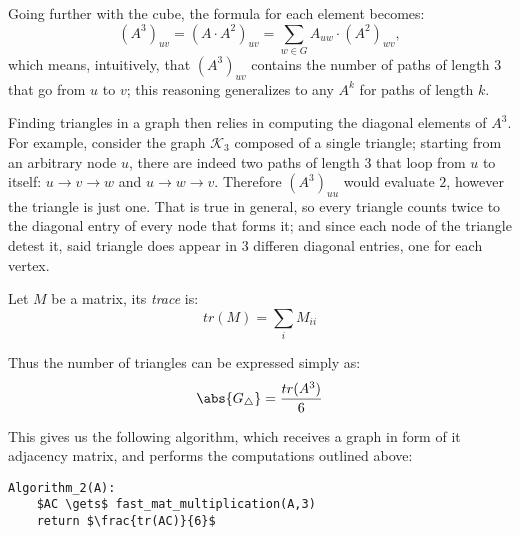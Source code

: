 Going further with the cube, the formula for each element becomes:
\[
    (A^3)_{uv} = \left( A \cdot A^2 \right)_{uv} = \sum_{w \in G} A_{uw} \cdot (A^2)_{wv},
\]
which means, intuitively, that $(A^3)_{uv}$ contains the number of paths of length $3$ that go from $u$ to $v$; this reasoning generalizes to any $A^k$ for paths of length $k$.

Finding triangles in a graph then relies in computing the diagonal elements of $A^3$. For example, consider the graph $\mathcal{K}_3$ composed of a single triangle; starting from an arbitrary node $u$, there are indeed two paths of length $3$ that loop from $u$ to itself: $u \to v \to w$ and $u \to w \to v$. Therefore $(A^3)_{uu}$ would evaluate $2$, however the triangle is just one. That is true in general, so every triangle counts twice to the diagonal entry of every node that forms it; and since each node of the triangle detest it, said triangle does appear in $3$ differen diagonal entries, one for each vertex.

\begin{definition}
    Let $M$ be a matrix, its \emph{trace} is:
    \begin{equation}\label{eq:trace}
        tr(M) = \sum_i M_{ii}
    \end{equation}
\end{definition}

Thus the number of triangles can be expressed simply as:
\begin{equation} \label{eq:triangles-1}
	\abs{G_\triangle} = \frac{tr(A^3)}{6}
\end{equation}

This gives us the following algorithm, which receives a graph in form of it adjacency matrix, and performs the computations outlined above:
\begin{lstlisting}[caption = {Algorithm 2}, label = {lst:triangles-alg2}]
Algorithm_2(A):
    $AC \gets$ fast_mat_multiplication(A,3)
    return $\frac{tr(AC)}{6}$
\end{lstlisting}

